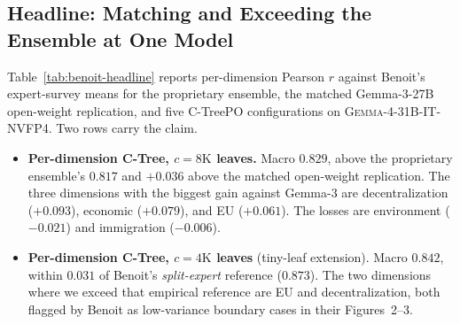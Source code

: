 \subsection{Headline: Matching and Exceeding the Ensemble at One Model}\label{sec:benoit-headline}

Table~\ref{tab:benoit-headline} reports per-dimension Pearson $r$
against Benoit's expert-survey means for the proprietary ensemble, the
matched Gemma-3-27B open-weight replication, and five C-TreePO
configurations on \textsc{Gemma-4-31B-IT-NVFP4}. Two rows carry the
claim.

\begin{itemize}[leftmargin=1.5em]
    \item \textbf{Per-dimension C-Tree, $c = 8\mathrm{K}$ leaves.}
          Macro $0.829$, above the proprietary ensemble's $0.817$ and
          $+0.036$ above the matched open-weight replication. The
          three dimensions with the biggest gain against Gemma-3
          are decentralization ($+0.093$), economic ($+0.079$), and
          EU ($+0.061$). The losses are environment ($-0.021$) and
          immigration ($-0.006$).
    \item \textbf{Per-dimension C-Tree, $c = 4\mathrm{K}$ leaves}
          (tiny-leaf extension). Macro $0.842$, within $0.031$ of
          Benoit's \emph{split-expert} reference ($0.873$). The
          two dimensions where we exceed that empirical reference are
          EU and decentralization, both flagged by Benoit as
          low-variance boundary cases in their Figures~2--3.
\end{itemize}

\begin{table}[htbp]
    \centering
    \resizebox{\linewidth}{!}{}
    \caption{Pearson $r$ against Benoit expert-survey means across six
    policy dimensions. The first block reproduces
    \citet{BenoitEtAl2025}'s published numbers (Fig.~1 proprietary
    ensemble, Tab.~3 split-expert reference, Tab.~6 open-weight
    replication at Gemma-3-27B). The Table~3 row is an empirical
    agreement reference, not a theoretical limit. The remaining
    blocks are C-TreePO on Gemma-4-31B-NVFP4 across chunk sizes $c$,
    under the per-dimension
    and joint variants. The macro column is the unweighted mean
    across dimensions for each row. Full per-cell table with
    coverage, ablations, and compute accounting appears in
    Appendix~\ref{app:benoit-replication}.}\label{tab:benoit-headline}
\end{table}

